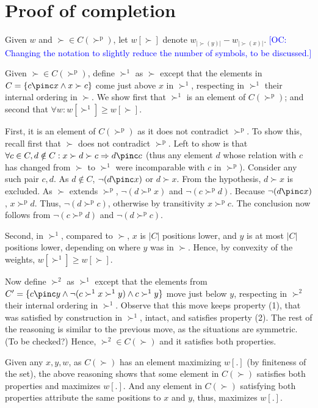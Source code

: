 \documentclass[12pt]{article}
\newcommand{\commentOC}[1]{\textcolor{blue}{\small$\big[$OC: #1$\big]$}}
\newcommand{\pref}{\succ}%
\newcommand{\ppref}{\succ^\text{p}}%
\begin{document}
\section{Proof of completion}
\label{sec:prfCompl}
Given $w$ and ${\pref} \in C(\ppref)$, let $w[\pref]$ denote $w_{|\pref(y)|} - w_{|\pref(x)|}$. \commentOC{Changing the notation to slightly reduce the number of symbols, to be discussed.}

Given ${\pref} \in C(\ppref)$, define $\pref^1$ as $\pref$ except that the elements in $C = \{c \pinc x \land x \pref c\}$ come just above $x$ in $\pref^1$, respecting in $\pref^1$ their internal ordering in $\pref$. We show first that $\pref^1$ is an element of $C(\ppref)$; and second that $\forall w: w[\pref^1] \geq w[\pref]$. 

First, it is an element of $C(\ppref)$ as it does not contradict $\ppref$. To show this, recall first that $\pref$ does not contradict $\ppref$. Left to show is that $\forall c \in C, d \notin C: x \pref d \pref c \Rightarrow d \pinc c$ (thus any element $d$ whose relation with $c$ has changed from $\pref$ to $\pref^1$ were incomparable with $c$ in $\ppref$). Consider any such pair $c, d$. As $d \notin C$, $\lnot(d \pinc x)$ or $d \pref x$. From the hypothesis, $d \pref x$ is excluded. 
As $\pref$ extends $\ppref$, $\lnot(d \ppref x)$ and $\lnot (c \ppref d)$. Because $\lnot (d \pinc x)$, $x \ppref d$. Thus, $\lnot (d \ppref c)$, otherwise by transitivity $x \ppref c$. The conclusion now follows from $\lnot (c \ppref d)$ and $\lnot (d \ppref c)$.

Second, in $\pref^1$, compared to $\pref$, $x$ is $|C|$ positions lower, and $y$ is at most $|C|$ positions lower, depending on where $y$ was in $\pref$. Hence, by convexity of the weights, $w[\pref^1] \geq w[\pref]$.

Now define $\pref^2$ as $\pref^1$ except that the elements from $C' = \{c \pinc y \land \lnot (c \pref^1 x \pref^1 y) \land c \pref^1 y\}$ move just below $y$, respecting in $\pref^2$ their internal ordering in $\pref^1$. Observe that this move keeps property (1), that was satisfied by construction in $\pref^1$, intact, and satisfies property (2). The rest of the reasoning is similar to the previous move, as the situations are symmetric. (To be checked?) Hence, ${\pref^2} \in C(\pref)$ and it satisfies both properties.

Given any $x, y, w$, as $C(\pref)$ has an element maximizing $w[.]$ (by finiteness of the set), the above reasoning shows that some element in $C(\pref)$ satisfies both properties and maximizes $w[.]$. And any element in $C(\pref)$ satisfying both properties attribute the same positions to $x$ and $y$, thus, maximizes $w[.]$.
\end{document}

